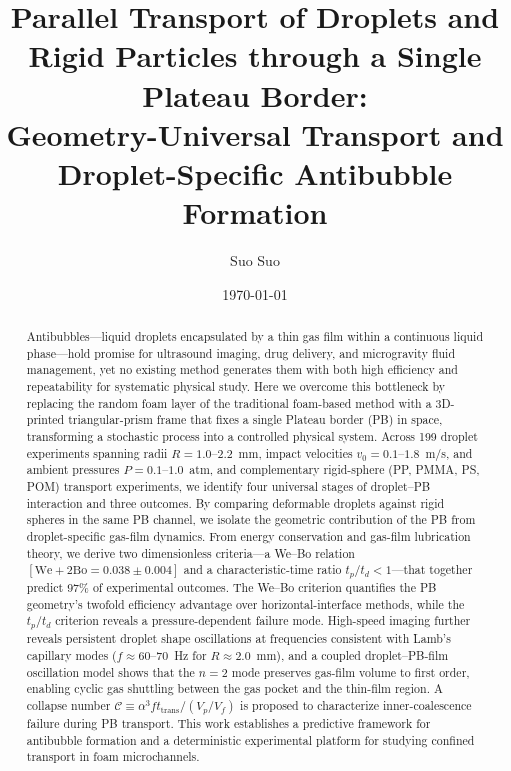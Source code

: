 \documentclass[%
 preprint,
 superscriptaddress,
 amsmath,amssymb,
 aps, prl,
]{revtex4-2}
\begin{document}

\title{Parallel Transport of Droplets and Rigid Particles through a Single Plateau Border:\\
Geometry-Universal Transport and Droplet-Specific Antibubble Formation}

\author{Suo Suo}

\date{\today}

\begin{abstract}
Antibubbles---liquid droplets encapsulated by a thin gas film within a continuous liquid phase---hold promise for ultrasound imaging, drug delivery, and microgravity fluid management, yet no existing method generates them with both high efficiency and repeatability for systematic physical study.
Here we overcome this bottleneck by replacing the random foam layer of the traditional foam-based method with a 3D-printed triangular-prism frame that fixes a single Plateau border (PB) in space, transforming a stochastic process into a controlled physical system.
Across 199 droplet experiments spanning radii $R = 1.0$--$2.2$~mm, impact velocities $v_0 = 0.1$--$1.8$~m/s, and ambient pressures $P = 0.1$--$1.0$~atm, and complementary rigid-sphere (PP, PMMA, PS, POM) transport experiments, we identify four universal stages of droplet--PB interaction and three outcomes.
By comparing deformable droplets against rigid spheres in the same PB channel, we isolate the geometric contribution of the PB from droplet-specific gas-film dynamics.
From energy conservation and gas-film lubrication theory, we derive two dimensionless criteria---a We--Bo relation $[\text{We} + 2\text{Bo} = 0.038 \pm 0.004]$ and a characteristic-time ratio $t_p/t_d < 1$---that together predict 97\% of experimental outcomes.
The We--Bo criterion quantifies the PB geometry's twofold efficiency advantage over horizontal-interface methods, while the $t_p/t_d$ criterion reveals a pressure-dependent failure mode.
High-speed imaging further reveals persistent droplet shape oscillations at frequencies consistent with Lamb's capillary modes ($f \approx 60$--$70$~Hz for $R \approx 2.0$~mm), and a coupled droplet--PB-film oscillation model shows that the $n=2$ mode preserves gas-film volume to first order, enabling cyclic gas shuttling between the gas pocket and the thin-film region.
A collapse number $\mathcal{C} \equiv \alpha^3 f t_{\text{trans}} / (V_p/V_f)$ is proposed to characterize inner-coalescence failure during PB transport.
This work establishes a predictive framework for antibubble formation and a deterministic experimental platform for studying confined transport in foam microchannels.
\end{abstract}
\end{document}
